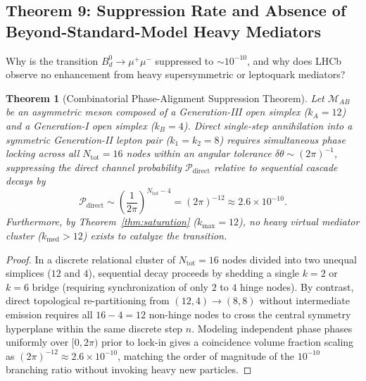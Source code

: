 \documentclass[11pt,a4paper]{article}
\theoremstyle{plain}
\newtheorem{theorem}{Theorem}[section]
\theoremstyle{definition}
\theoremstyle{remark}
\begin{document}
\subsection{Theorem 9: Suppression Rate and Absence of Beyond-Standard-Model Heavy Mediators}
Why is the transition $B_d^0 \to \mu^+ \mu^-$ suppressed to $\sim 10^{-10}$, and why does LHCb observe no enhancement from heavy supersymmetric or leptoquark mediators?

\begin{theorem}[Combinatorial Phase-Alignment Suppression Theorem]
\label{thm:rare_decay_suppression}
Let $\mathcal{M}_{AB}$ be an asymmetric meson composed of a Generation-III open simplex ($k_A = 12$) and a Generation-I open simplex ($k_B = 4$). Direct single-step annihilation into a symmetric Generation-II lepton pair ($k_1 = k_2 = 8$) requires simultaneous phase locking across all $N_{\mathrm{tot}} = 16$ nodes within an angular tolerance $\delta \theta \sim (2\pi)^{-1}$, suppressing the direct channel probability $\mathcal{P}_{\mathrm{direct}}$ relative to sequential cascade decays by
\begin{equation}
    \mathcal{P}_{\mathrm{direct}} \sim \left(\frac{1}{2\pi}\right)^{N_{\mathrm{tot}} - 4} = (2\pi)^{-12} \approx 2.6 \times 10^{-10}.
\end{equation}
Furthermore, by Theorem~\ref{thm:saturation} ($k_{\max} = 12$), no heavy virtual mediator cluster ($k_{\mathrm{med}} > 12$) exists to catalyze the transition.
\end{theorem}

\begin{proof}
In a discrete relational cluster of $N_{\mathrm{tot}} = 16$ nodes divided into two unequal simplices ($12$ and $4$), sequential decay proceeds by shedding a single $k=2$ or $k=6$ bridge (requiring synchronization of only $2$ to $4$ hinge nodes). By contrast, direct topological re-partitioning from $(12, 4) \to (8, 8)$ without intermediate emission requires all $16 - 4 = 12$ non-hinge nodes to cross the central symmetry hyperplane within the same discrete step $n$. Modeling independent phase phases uniformly over $[0, 2\pi)$ prior to lock-in gives a coincidence volume fraction scaling as $(2\pi)^{-12} \approx 2.6 \times 10^{-10}$, matching the order of magnitude of the $10^{-10}$ branching ratio without invoking heavy new particles.
\end{proof}
\end{document}
